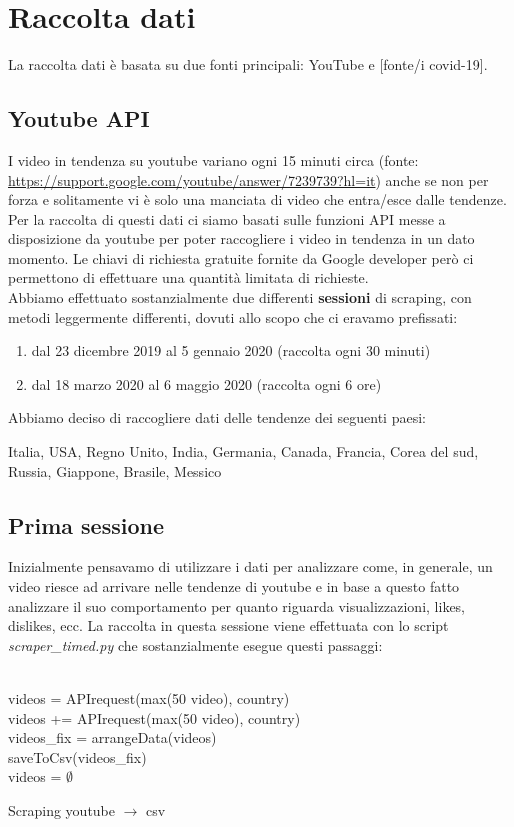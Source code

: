 \section*{Raccolta dati}
La raccolta dati è basata su due fonti principali: YouTube e [fonte/i covid-19].
\subsection*{Youtube API}
I video in tendenza su youtube variano ogni 15 minuti circa (fonte: \url{https://support.google.com/youtube/answer/7239739?hl=it}) anche se non per forza e solitamente vi è solo una manciata di video che entra/esce dalle tendenze. Per la raccolta di questi dati ci siamo basati sulle funzioni API messe a disposizione da youtube per poter raccogliere i video in tendenza in un dato momento. Le chiavi di richiesta gratuite fornite da Google developer però ci permettono di effettuare una quantità limitata di richieste. 
\\
Abbiamo effettuato sostanzialmente due differenti \textbf{sessioni} di scraping, con metodi leggermente differenti, dovuti allo scopo che ci eravamo prefissati: 
\begin{enumerate}
	\item dal 23 dicembre 2019 al 5 gennaio 2020 (raccolta ogni 30 minuti)
	\item dal 18 marzo 2020 al 6 maggio 2020 (raccolta ogni 6 ore)
\end{enumerate}
Abbiamo deciso di raccogliere dati delle tendenze dei seguenti paesi:

Italia, USA, Regno Unito, India, Germania, Canada, Francia, Corea del sud, Russia, Giappone, Brasile, Messico\\

\subsection*{Prima sessione}
Inizialmente pensavamo di utilizzare i dati per analizzare come, in generale, un video riesce ad arrivare nelle tendenze di youtube e in base a questo fatto analizzare il suo comportamento per quanto riguarda visualizzazioni, likes, dislikes, ecc. La raccolta in questa sessione viene effettuata con lo script \textit{scraper\_timed.py} che sostanzialmente esegue questi passaggi:\\
\\
\begin{algorithm}[H]
	\nl {} {
	\nl {}
	{
		\nl videos = APIrequest(max(50 video), country)\\
		\nl {}
		{
			\nl videos += APIrequest(max(50 video), country) \\
		}
		\nl videos\_fix = arrangeData(videos)\\ 
		\nl saveToCsv(videos\_fix) \\
		\nl videos = $\emptyset$
	}
	}
	\caption{Scraping youtube $\rightarrow$ csv}
\end{algorithm}

